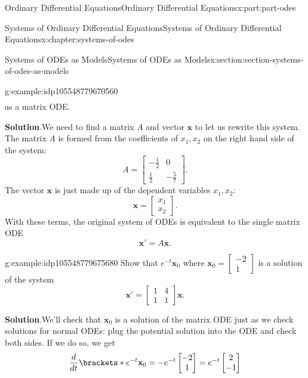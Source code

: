 \documentclass[oneside,10pt,]{book}
\newcommand{\blocktitlefont}{\relax}
\numberwithin{equation}{part}
\renewcommand{\vec}[1]{\mathbf{#1}}
\newcommand{\dv}[3][]{\dfrac{d^{#1} #2}{d #3^{#1}}}
\newcommand{\amp}{&}
\begin{document}
\begin{partptx}{Ordinary Differential Equations}{}{Ordinary Differential Equations}{}{}{x:part:part-odes}
\begin{chapterptx}{Systems of Ordinary Differential Equations}{}{Systems of Ordinary Differential Equations}{}{}{x:chapter:systems-of-odes}
\begin{sectionptx}{Systems of ODEs as Models}{}{Systems of ODEs as Models}{}{}{x:section:section-systems-of-odes-as-models}
\begin{example}{}{g:example:idp105548779670560}
\begin{align*}
\end{align*}
as a matrix ODE.%
\par\smallskip%
\noindent\textbf{\blocktitlefont Solution}.\hypertarget{g:solution:idp105548779671840}{}\quad{}We need to find a matrix \(A\) and vector \(\vec{x}\) to let us rewrite this system. The matrix \(A\) is formed from the coefficients of \(x_{1},x_{2}\) on the right hand side of the system:%
\begin{equation*}
A = \begin{bmatrix}-\frac{1}{2}\amp 0\\\frac{1}{2}\amp -\frac{5}{7}\end{bmatrix}.
\end{equation*}
The vector \(\vec{x}\) is just made up of the dependent variables \(x_{1},x_{2}\):%
\begin{equation*}
\vec{x} = \begin{bmatrix}x_{1}\\x_{2}\end{bmatrix}.
\end{equation*}
With these terms, the original system of ODEs is equivalent to the single matrix ODE%
\begin{equation*}
\vec{x}' = A\vec{x}.
\end{equation*}
%
\end{example}
\begin{example}{}{g:example:idp105548779675680}%
Show that \(e^{-t}\vec{x}_{0}\) where \(\vec{x}_{0} = \begin{bmatrix}-2\\1\end{bmatrix}\) is a solution of the system%
\begin{equation*}
\vec{x}' = \begin{bmatrix}1\amp 4\\1\amp 1\end{bmatrix}\vec{x}.
\end{equation*}
%
\par\smallskip%
\noindent\textbf{\blocktitlefont Solution}.\hypertarget{g:solution:idp105548779677344}{}\quad{}We'll check that \(\vec{x}_{0}\) is a solution of the matrix ODE just as we check solutions for normal ODEs: plug the potential solution into the ODE and check both sides. If we do so, we get%
\begin{equation*}
\dv{}{t}\brackets*{e^{-t}\vec{x}_{0}} = -e^{-t}\begin{bmatrix}-2\\1\end{bmatrix} = e^{-t}\begin{bmatrix}2\\-1\end{bmatrix}

\end{equation*}
\end{example}
\end{sectionptx}
\end{chapterptx}
\end{partptx}
\end{document}
